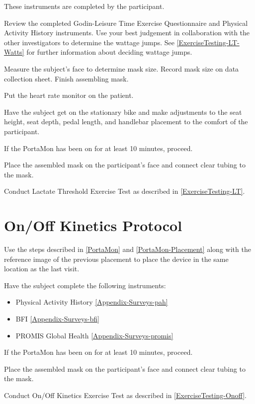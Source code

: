 \documentclass[
]{book}
\providecommand{\tightlist}{%
  \setlength{\itemsep}{0pt}\setlength{\parskip}{0pt}}
\begin{document}
These instruments are completed by the participant.

Review the completed Godin-Leisure Time Exercise Questionnaire and Physical Activity History instruments. Use your best judgement in collaboration with the other investigators to determine the wattage jumps. See \ref{ExerciseTesting-LT-Watts} for further information about deciding wattage jumps.

Measure the subject's face to determine mask size. Record mask size on data collection sheet. Finish assembling mask.

Put the heart rate monitor on the patient.

Have the subject get on the stationary bike and make adjustments to the seat height, seat depth, pedal length, and handlebar placement to the comfort of the participant.

If the PortaMon has been on for at least 10 minutes, proceed.

Place the assembled mask on the participant's face and connect clear tubing to the mask.

Conduct Lactate Threshold Exercise Test as described in \ref{ExerciseTesting-LT}.

\hypertarget{Methods-Onoff}{%
\section{On/Off Kinetics Protocol}\label{Methods-Onoff}}

Use the steps described in \ref{PortaMon} and \ref{PortaMon-Placement} along with the reference image of the previous placement to place the device in the same location as the last visit.

Have the subject complete the following instruments:

\begin{itemize}
\tightlist
\item
  Physical Activity History \ref{Appendix-Surveys-pah}
\item
  BFI \ref{Appendix-Surveys-bfi}
\item
  PROMIS Global Health \ref{Appendix-Surveys-promis}
\end{itemize}

If the PortaMon has been on for at least 10 minutes, proceed.

Place the assembled mask on the participant's face and connect clear tubing to the mask.

Conduct On/Off Kinetics Exercise Test as described in \ref{ExerciseTesting-Onoff}.
\end{document}
